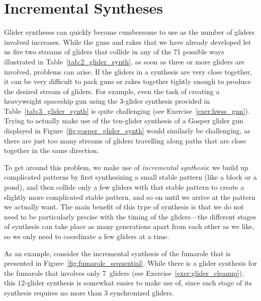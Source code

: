 

\section{Incremental Syntheses}\label{sec:incremental_synthesis}

Glider syntheses can quickly become cumbersome to use as the number of gliders involved increases. While the guns and rakes that we have already developed let us fire two streams of gliders that collide in any of the 71 possible ways illustrated in Table~\ref{tab:2_glider_synth}, as soon as three or more gliders are involved, problems can arise. If the gliders in a synthesis are very close together, it can be very difficult to pack guns or rakes together tightly enough to produce the desired stream of gliders. For example, even the task of creating a heavyweight spaceship gun using the 3-glider synthesis provided in Table~\ref{tab:3_glider_synth} is quite challenging (see Exercise~\ref{exer:hwss_gun}). Trying to actually make use of the ten-glider synthesis of a Gosper glider gun displayed in Figure~\ref{fig:gosper_glider_synth} would similarly be challenging, as there are just too many streams of gliders travelling along paths that are close together in the same direction.

To get around this problem, we make use of \emph{incremental synthesis}: we build up complicated patterns by first synthesizing a small stable pattern (like a block or a pond), and then collide only a few gliders with that stable pattern to create a slightly more complicated stable pattern, and so on until we arrive at the pattern we actually want. The main benefit of this type of synthesis is that we do not need to be particularly precise with the timing of the gliders---the different stages of synthesis can take place as many generations apart from each other as we like, so we only need to coordinate a few gliders at a time.

As an example, consider the incremental synthesis of the fumarole that is presented in Figure~\ref{fig:fumarole_sequential}. While there is a glider synthesis for the fumarole that involves only $7$~gliders (see Exercise~\ref{exer:glider_cleanup}), this $12$-glider synthesis is somewhat easier to make use of, since each stage of its synthesis requires no more than $3$ synchronized gliders.

